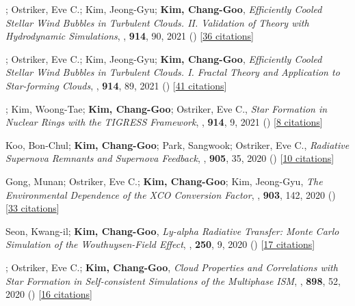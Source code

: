 \item[{21.}]; Ostriker, Eve C.; Kim, Jeong-Gyu; \textbf{Kim, Chang-Goo}, \textit{Efficiently Cooled Stellar Wind Bubbles in Turbulent Clouds. II. Validation of Theory with Hydrodynamic Simulations}, , \textbf{914}, 90, 2021 () [\href{http://adsabs.harvard.edu/abs/2021ApJ...914...90L}{36 citations}]

\item[{20.}]; Ostriker, Eve C.; Kim, Jeong-Gyu; \textbf{Kim, Chang-Goo}, \textit{Efficiently Cooled Stellar Wind Bubbles in Turbulent Clouds. I. Fractal Theory and Application to Star-forming Clouds}, , \textbf{914}, 89, 2021 () [\href{http://adsabs.harvard.edu/abs/2021ApJ...914...89L}{41 citations}]

\item[{19.}]; Kim, Woong-Tae; \textbf{Kim, Chang-Goo}; Ostriker, Eve C., \textit{Star Formation in Nuclear Rings with the TIGRESS Framework}, , \textbf{914}, 9, 2021 () [\href{http://adsabs.harvard.edu/abs/2021ApJ...914....9M}{8 citations}]

\item[{18.}]Koo, Bon-Chul; \textbf{Kim, Chang-Goo}; Park, Sangwook; Ostriker, Eve C., \textit{Radiative Supernova Remnants and Supernova Feedback}, , \textbf{905}, 35, 2020 () [\href{http://adsabs.harvard.edu/abs/2020ApJ...905...35K}{10 citations}]

\item[{17.}]Gong, Munan; Ostriker, Eve C.; \textbf{Kim, Chang-Goo}; Kim, Jeong-Gyu, \textit{The Environmental Dependence of the XCO Conversion Factor}, , \textbf{903}, 142, 2020 () [\href{http://adsabs.harvard.edu/abs/2020ApJ...903..142G}{33 citations}]

\item[{16.}]Seon, Kwang-il; \textbf{Kim, Chang-Goo}, \textit{Ly-alpha Radiative Transfer: Monte Carlo Simulation of the Wouthuysen-Field Effect}, , \textbf{250}, 9, 2020 () [\href{http://adsabs.harvard.edu/abs/2020ApJS..250....9S}{17 citations}]

\item[{15.}]; Ostriker, Eve C.; \textbf{Kim, Chang-Goo}, \textit{Cloud Properties and Correlations with Star Formation in Self-consistent Simulations of the Multiphase ISM}, , \textbf{898}, 52, 2020 () [\href{http://adsabs.harvard.edu/abs/2020ApJ...898...52M}{16 citations}]

